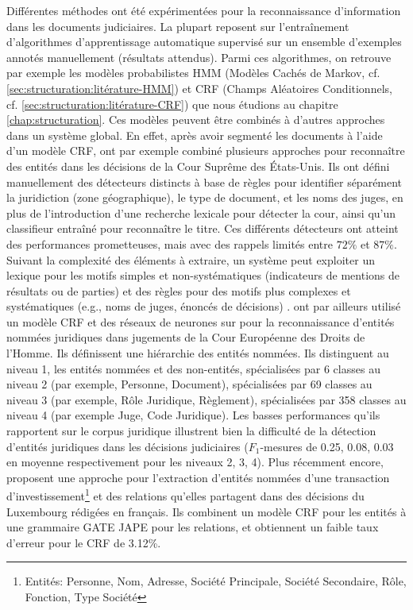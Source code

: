 Différentes méthodes ont été expérimentées pour la reconnaissance d'information dans les documents judiciaires. La plupart reposent sur l'entraînement d'algorithmes d'apprentissage automatique supervisé sur un ensemble d'exemples annotés manuellement (résultats attendus). Parmi ces algorithmes, on retrouve par exemple les modèles probabilistes HMM (Modèles Cachés de Markov, cf. \ref{sec:structuration:litérature-HMM}) et CRF (Champs Aléatoires Conditionnels, cf. \ref{sec:structuration:litérature-CRF}) que nous étudions au chapitre \ref{chap:structuration}. Ces modèles peuvent être combinés à d'autres approches dans un système global. En effet, après avoir segmenté les documents à l'aide d'un modèle CRF, \citet{dozier2010legalnerr} ont par exemple combiné plusieurs approches pour reconnaître des entités dans les décisions de la Cour Suprême des États-Unis. Ils ont défini manuellement des détecteurs distincts à base de règles pour identifier séparément la juridiction (zone géographique), le type de document, et les noms des juges, en plus de l'introduction d'une recherche lexicale pour détecter la cour, ainsi qu'un classifieur entraîné pour reconnaître le titre. Ces différents détecteurs ont atteint des performances prometteuses, mais avec des rappels limités entre $ 72 \% $ et $ 87 \% $. Suivant la complexité des éléments à extraire, un système peut exploiter un lexique pour les motifs simples et non-systématiques (indicateurs de mentions de résultats ou de parties) et des règles pour des motifs plus complexes et systématiques (e.g., noms de juges, énoncés de décisions) \citep{Waltl2016lexia,waltl2017legaliegerman, wyner2010extractlegalelts}. \cite{cardellino2017legalNERCL} ont par ailleurs utilisé un modèle CRF et des réseaux de neurones sur pour la reconnaissance d'entités nommées juridiques dans  jugements de la Cour Européenne des Droits de l'Homme.
Ils définissent une hiérarchie des entités nommées. Ils distinguent au niveau 1, les entités nommées et des non-entités,  spécialisées par 6 classes au niveau 2 (par exemple, Personne, Document), spécialisées par 69 classes au niveau 3 (par exemple, Rôle Juridique, Règlement), spécialisées par 358 classes au niveau 4 (par exemple Juge, Code Juridique). Les basses performances qu'ils rapportent sur le corpus juridique illustrent bien la difficulté de la détection d'entités juridiques dans les décisions judiciaires ($F_1$-mesures de 0.25, 0.08, 0.03 en moyenne respectivement pour les niveaux 2, 3, 4). Plus récemment encore, \citet{andrew2018legalNerAndRelation} proposent une approche pour l'extraction d'entités nommées d'une transaction d'investissement\footnote{Entités: Personne, Nom, Adresse, Société Principale, Société Secondaire, Rôle, Fonction, Type Société} et des relations qu'elles partagent dans des décisions du Luxembourg rédigées en français. Ils combinent un modèle CRF pour les entités à  une grammaire GATE JAPE \citep{thakker2009gatejape} pour les relations, et obtiennent un faible taux d'erreur pour le CRF de 3.12\%. %

